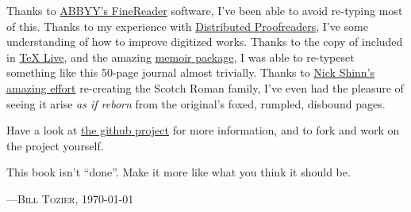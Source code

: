 Thanks to \href{http://abbyy.com}{ABBYY's FineReader} software, I've been able to avoid re-typing most of this. Thanks to my experience with \href{http://pgdp.net}{Distributed Proofreaders}, I've some understanding of how to improve digitized works. Thanks to the copy of \href{http://scripts.sil.org/cms/scripts/page.php?site_id=nrsi&id=xetex}{\XeLaTeX} included in \href{http://www.tug.org/texlive/}{TeX Live}, and the amazing \href{http://www.tex.ac.uk/CTAN/macros/latex2e/contrib/memoir/}{\textsf{memoir} package}, I was able to re-typeset something like this 50-page journal almost trivially. Thanks to \href{http://shinntype.com/}{Nick Shinn's amazing effort} re-creating the Scotch Roman family, I've even had the pleasure of seeing it arise \emph{as if reborn} from the original's foxed, rumpled, disbound  pages.

Have a look at \href{http://github.com/Vaguery/collegeJournalOfMedicalScienceSeptember1857}{the github project} for more information, and to fork and work on the project yourself.

This book isn't ``done''. Make it more like what you think it should be.

\hfill{}---\textsc{Bill Tozier}, \today 
